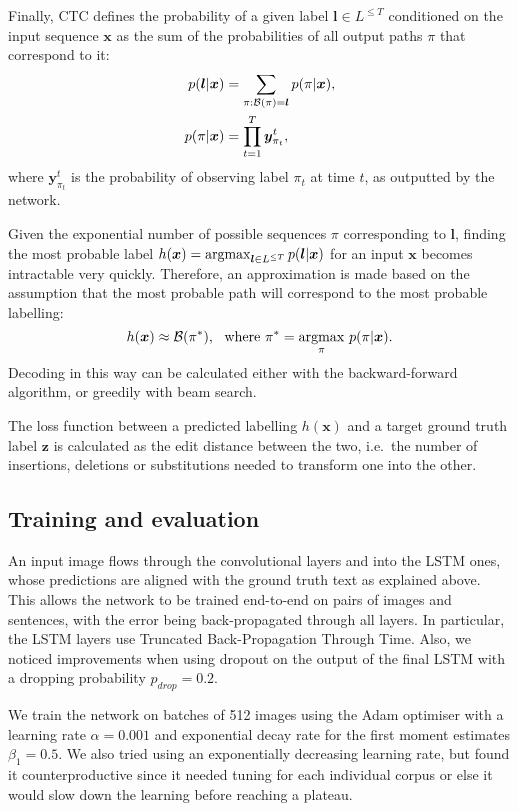 	 		Finally, CTC defines the probability of a given label \(\bm{l} \in L^{\leq T}\) conditioned on the input sequence \(\mathbf{x}\) as the sum of the probabilities of all output paths \(\pi\) that correspond to it:
	 		\begin{align*}
				p(\bm{l} | \bm{x}) &= \sum_{\pi:{\cal B}(\pi)=\bm{l}}p(\pi|\bm{x}), \\
				p(\pi | \bm{x}) &= \prod_{t=1}^T \bm{y}_{\pi_t}^{t},
				\label{eq:stringprob}
			\end{align*}
			where \(\bm{y}_{\pi_t}^{t}\) is the probability of observing label \(\pi_t\) at time \(t\), as outputted by the network.

			Given the exponential number of possible sequences \(\pi\) corresponding to \(\bm l\), finding the most probable label \(h(\bm{x}) = \operatorname{argmax}_{\bm{l} \in L^{\leq T}} p(\bm{l} | \bm{x})\) for an input \(\bm x\) becomes intractable very quickly. Therefore, an approximation is made based on the assumption that the most probable path will correspond to the most probable labelling:\[
				h(\bm{x}) \approx \mathcal{B}(\pi^*),~~ \text{where } \pi^* = \underset{\pi}{\operatorname{argmax}}~ p(\pi|\bm{x}).
			\] Decoding in this way can be calculated either with the backward-forward algorithm, or greedily with beam search.

			The loss function between a predicted labelling \(h(\bm{x})\) and a target ground truth label \(\bm z\) is calculated as the edit distance between the two, i.e.\ the number of insertions, deletions or substitutions needed to transform one into the other.


	\subsection{Training and evaluation}
		An input image flows through the convolutional layers and into the LSTM ones, whose predictions are aligned with the ground truth text as explained above. This allows the network to be trained end-to-end on pairs of images and sentences, with the error being back-propagated through all layers. In particular, the LSTM layers use Truncated Back-Propagation Through Time. Also, we noticed improvements when using dropout on the output of the final LSTM with a dropping probability \(p_\mathit{drop} = 0.2\).

		We train the network on batches of 512 images using the Adam optimiser \citep{adam} with a learning rate \(\alpha = 0.001\) and exponential decay rate for the first moment estimates \(\beta_1 = 0.5\). We also tried using an exponentially decreasing learning rate, but found it counterproductive since it needed tuning for each individual corpus or else it would slow down the learning before reaching a plateau.

